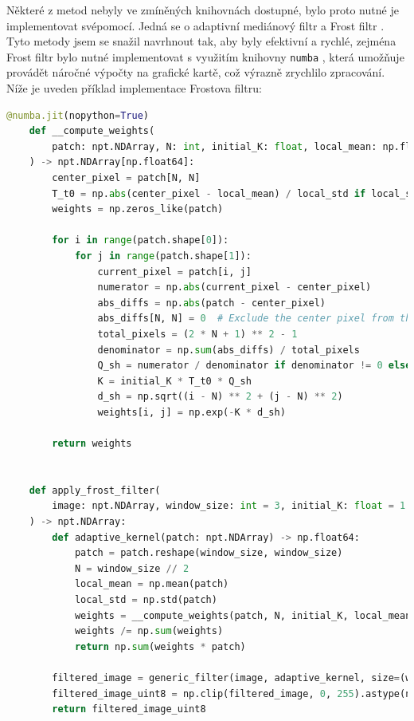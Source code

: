 \documentclass[male,czech,api_ing]{thesis}
\begin{document}
Některé z metod nebyly ve zmíněných knihovnách dostupné, bylo proto nutné je implementovat svépomocí. Jedná se o adaptivní mediánový filtr a Frost filtr \cite{FrostFilter}. Tyto metody jsem se snažil navrhnout tak, aby byly efektivní a rychlé, zejména Frost filtr bylo nutné implementovat s využitím knihovny \texttt{numba} \cite{numba}, která umožňuje provádět náročné výpočty na grafické kartě, což výrazně zrychlilo zpracování. Níže je uveden příklad implementace Frostova filtru:

\begin{lstlisting}[language=Python, caption={Implementace Frost filtru s využitím Numba CUDA}, label={lst:frost_filter}]
    @numba.jit(nopython=True)
    def __compute_weights(
        patch: npt.NDArray, N: int, initial_K: float, local_mean: np.float64, local_std: np.float64
    ) -> npt.NDArray[np.float64]:
        center_pixel = patch[N, N]
        T_t0 = np.abs(center_pixel - local_mean) / local_std if local_std != 0 else 0
        weights = np.zeros_like(patch)
    
        for i in range(patch.shape[0]):
            for j in range(patch.shape[1]):
                current_pixel = patch[i, j]
                numerator = np.abs(current_pixel - center_pixel)
                abs_diffs = np.abs(patch - center_pixel)
                abs_diffs[N, N] = 0  # Exclude the center pixel from the sum
                total_pixels = (2 * N + 1) ** 2 - 1
                denominator = np.sum(abs_diffs) / total_pixels
                Q_sh = numerator / denominator if denominator != 0 else 0
                K = initial_K * T_t0 * Q_sh
                d_sh = np.sqrt((i - N) ** 2 + (j - N) ** 2)
                weights[i, j] = np.exp(-K * d_sh)
        
        return weights
    
    
    def apply_frost_filter(
        image: npt.NDArray, window_size: int = 3, initial_K: float = 1.0
    ) -> npt.NDArray:
        def adaptive_kernel(patch: npt.NDArray) -> np.float64:
            patch = patch.reshape(window_size, window_size)
            N = window_size // 2
            local_mean = np.mean(patch)
            local_std = np.std(patch)
            weights = __compute_weights(patch, N, initial_K, local_mean, local_std)
            weights /= np.sum(weights)
            return np.sum(weights * patch)
    
        filtered_image = generic_filter(image, adaptive_kernel, size=(window_size, window_size))
        filtered_image_uint8 = np.clip(filtered_image, 0, 255).astype(np.uint8)
        return filtered_image_uint8
\end{lstlisting}
\end{document}
